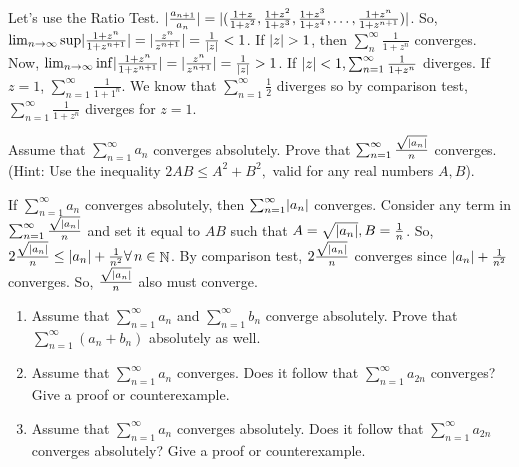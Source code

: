 \documentclass[12pt,letterpaper,boxed]{hmcpset}
\DeclareMathOperator{\N}{\mathbb{N}}
\DeclarePairedDelimiter\abs{\lvert}{\rvert}%
\begin{document}
\begin{solution}
Let's use the Ratio Test. $\abs{\frac{a_{n+1}}{a_n}} = \abs{(\frac{1+z}{1 + z^{2}}, \frac{1+z^{2}}{1+z^{3}},\frac{1+z^{3}}{1+z^{4}},\dots, \frac{1+z^{n}}{1+z^{n+1}})}$. So, $\lim_{n\rightarrow \infty} \sup \abs{\frac{1+z^{n}}{1+z^{n+1}}} = \abs{\frac{z^{n}}{z^{n+1}}} = \frac{1}{\abs{z}} < 1$. If $\abs{z}>1$, then $\sum_{n}^{\infty}\frac{1}{1 + z^{n}}$ converges. Now, $\lim_{n\rightarrow \infty} \inf \abs{\frac{1+z^{n}}{1+z^{n+1}}} = \abs{\frac{z^{n}}{z^{n+1}}} = \frac{1}{\abs{z}} > 1$. If $\abs{z} < 1, \sum_{n=1}^{\infty} \frac{1}{1 + z^{n}}$ diverges. If $z=1$, $\sum_{n=1}^{\infty} \frac{1}{1 + 1^{n}}$. We know that $\sum_{n=1}^{\infty} \frac{1}{2}$ diverges so by comparison test, $\sum_{n=1}^{\infty} \frac{1}{1 + z^{n}}$ diverges for $z=1$.
\end{solution}


\begin{problem}[Exercise 3.6]
Assume that $\sum_{n = 1}^{\infty} a_n$ converges absolutely. Prove that $\sum_{n =1}^{\infty} \frac{\sqrt{\abs{a_n}}}{n}$ converges. (Hint: Use the inequality $2AB \leq A^{2} + B^{2},$ valid for any real numbers $A, B$).
\end{problem}


\begin{solution}
If $\sum_{n = 1}^{\infty} a_n$ converges absolutely, then $\sum_{n = 1}^{\infty} \abs{a_n}$ converges. Consider any term in $\sum_{n =1}^{\infty} \frac{\sqrt{\abs{a_n}}}{n}$ and set it equal to $AB$ such that $A = \sqrt{\abs{a_n}}, B = \frac{1}{n}$. So, $2\frac{\sqrt{\abs{a_n}}}{n} \leq \abs{a_n} + \frac{1}{n^{2}} \forall\,n\in\N$. By comparison test, $2\frac{\sqrt{\abs{a_n}}}{n}$ converges since $\abs{a_n} + \frac{1}{n^{2}}$ converges. So, $\frac{\sqrt{\abs{a_n}}}{n}$ also must converge.
\end{solution}


\begin{problem}[Exercise 3.7]
\begin{enumerate}
    \item Assume that $\sum_{n = 1}^{\infty} a_n$ and $\sum_{n = 1}^{\infty} b_n$ converge absolutely. Prove that $\sum_{n = 1}^{\infty} (a_n + b_n)$ absolutely as well.
    \item Assume that $\sum_{n = 1}^{\infty} a_n$ converges. Does it follow that $\sum_{n = 1}^{\infty} a_{2n}$ converges? Give a proof or counterexample.
    \item Assume that $\sum_{n = 1}^{\infty} a_n$ converges absolutely. Does it follow that $\sum_{n = 1}^{\infty} a_{2n}$ converges absolutely? Give a proof or counterexample.
\end{enumerate}
\end{problem}
\end{document}
